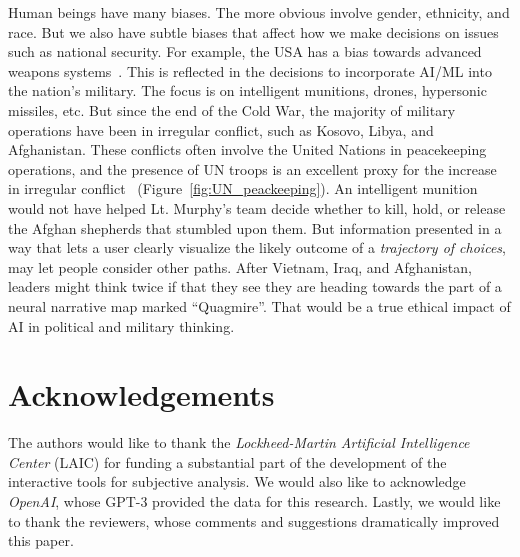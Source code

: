 \documentclass[11pt,dvipdfm]{article}
\begin{document}
Human beings have many biases. The more obvious involve gender, ethnicity, and race. But we also have subtle biases that affect how we make decisions on issues such as national security. For example, the USA has a bias towards advanced weapons systems~\cite{USA_Military_budget_2021}. This is reflected in the decisions to incorporate AI/ML into the nation's military. The focus is on intelligent munitions, drones, hypersonic missiles, etc. But since the end of the Cold War, the majority of military operations have been in irregular conflict, such as Kosovo, Libya, and Afghanistan. These conflicts often involve the United Nations in peacekeeping operations, and the presence of UN troops is an excellent proxy for the increase in irregular conflict~\cite{owidpeacekeeping} (Figure~\ref{fig:UN_peackeeping}). An intelligent munition would not have helped Lt. Murphy's team decide whether to kill, hold, or release the Afghan shepherds that stumbled upon them. But information presented in a way that lets a user clearly visualize the likely outcome of a \textit{trajectory of choices}, may let people consider other paths. After Vietnam, Iraq, and Afghanistan, leaders might think twice if that they see they are heading towards the part of a neural narrative map marked \enquote{Quagmire}. That would be a true ethical impact of AI in political and military thinking.



\section{Acknowledgements}
The authors would like to thank the \textit{Lockheed-Martin Artificial Intelligence Center} (LAIC) for funding a substantial part of the development of the interactive tools for subjective analysis. We would also like to acknowledge \emph{OpenAI}, whose GPT-3 provided the data for this research. Lastly, we would like to thank the reviewers, whose comments and suggestions dramatically improved this paper.
 
\end{document}
